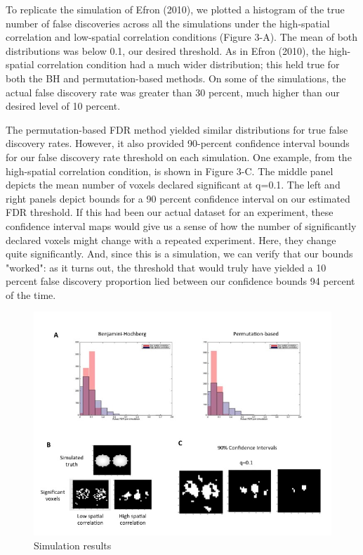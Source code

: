 \documentclass[11pt,notitlepage]{article}
\begin{document}
To replicate the simulation of Efron (2010), we plotted a histogram of the true number of false discoveries across all the simulations under the high-spatial correlation and low-spatial correlation conditions (Figure 3-A). The mean of both distributions was below 0.1, our desired threshold. As in Efron (2010), the high-spatial correlation condition had a much wider distribution; this held true for both the BH and permutation-based methods. On some of the simulations, the actual false discovery rate was greater than 30 percent, much higher than our desired level of 10 percent. 

The permutation-based FDR method yielded similar distributions for true false discovery rates. However, it also provided 90-percent confidence interval bounds for our false discovery rate threshold on each simulation. One example, from the high-spatial correlation condition, is shown in Figure 3-C. The middle panel depicts the mean number of voxels declared significant at q=0.1. The left and right panels depict bounds for a 90 percent confidence interval on our estimated FDR threshold. If this had been our actual dataset for an experiment, these confidence interval maps would give us a sense of how the number of significantly declared voxels might change with a repeated experiment. Here, they change quite significantly. And, since this is a simulation, we can verify that our bounds "worked": as it turns out, the threshold that would truly have yielded a 10 percent false discovery proportion lied between our confidence bounds 94 percent of the time. 


\begin{figure}[h c] %
\centering
\includegraphics[scale = .60]{Figures/Slide3.jpg}
\caption{\footnotesize Simulation results}
\end{figure}
\end{document}
